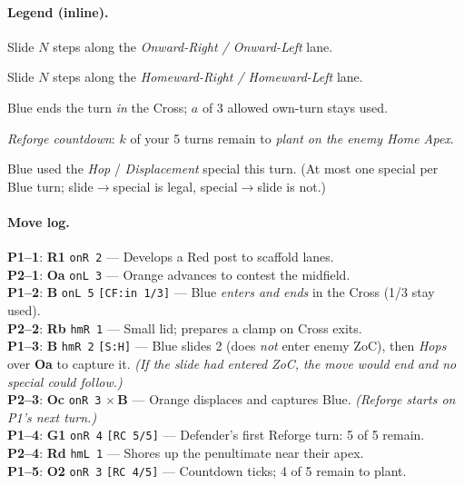 \documentclass[11pt]{article}
\begin{document}
\paragraph{Legend (inline).}
\begin{description}[leftmargin=2.5em,labelsep=0.6em]
  \item[\texttt{onR N} / \texttt{onL N}] Slide $N$ steps along the \emph{Onward-Right / Onward-Left} lane.
  \item[\texttt{hmR N} / \texttt{hmL N}] Slide $N$ steps along the \emph{Homeward-Right / Homeward-Left} lane.
  \item[\texttt{[CF:in a/3]}] Blue ends the turn \emph{in} the Cross; $a$ of 3 allowed own-turn stays used.
  \item[\texttt{[RC k/5]}] \emph{Reforge countdown}: $k$ of your 5 turns remain to \emph{plant on the enemy Home Apex}.
  \item[\texttt{[S:H]} / \texttt{[S:D]}] Blue used the \emph{Hop} / \emph{Displacement} special this turn. (At most one special per Blue turn; slide$\rightarrow$special is legal, special$\rightarrow$slide is not.)
\end{description}

\paragraph{Move log.}
\noindent\textbf{P1--1}: \textbf{R1} \texttt{onR 2} — Develops a Red post to scaffold lanes.\\
\textbf{P2--1}: \textbf{Oa} \texttt{onL 3} — Orange advances to contest the midfield.\\[2pt]
\textbf{P1--2}: \textbf{B} \texttt{onL 5} \texttt{[CF:in 1/3]} — Blue \emph{enters and ends} in the Cross (1/3 stay used).\\
\textbf{P2--2}: \textbf{Rb} \texttt{hmR 1} — Small lid; prepares a clamp on Cross exits.\\[2pt]
\textbf{P1--3}: \textbf{B} \texttt{hmR 2} \texttt{[S:H]} — Blue slides 2 (does \emph{not} enter enemy ZoC), then \emph{Hops} over \textbf{Oa} to capture it. \emph{(If the slide had entered ZoC, the move would end and no special could follow.)}\\
\textbf{P2--3}: \textbf{Oc} \texttt{onR 3} $\times$\,\textbf{B} — Orange displaces and captures Blue. \emph{(Reforge starts on P1’s next turn.)}\\[2pt]
\textbf{P1--4}: \textbf{G1} \texttt{onR 4} \texttt{[RC 5/5]} — Defender’s first Reforge turn: 5 of 5 remain.\\
\textbf{P2--4}: \textbf{Rd} \texttt{hmL 1} — Shores up the penultimate near their apex.\\
\textbf{P1--5}: \textbf{O2} \texttt{onR 3} \texttt{[RC 4/5]} — Countdown ticks; 4 of 5 remain to plant.\\[4pt]
\end{document}
